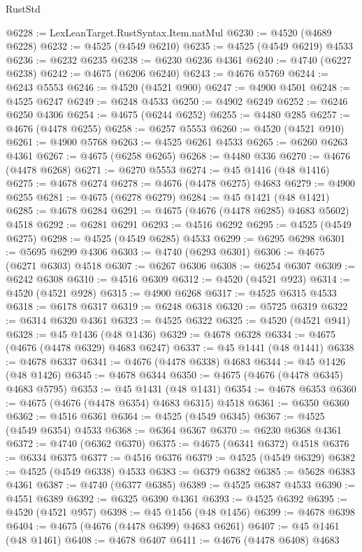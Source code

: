\begin{lexlean}{RustStd}
\begin{coremodule}
@6228 := LexLeanTarget.RustSyntax.Item.natMul
@6230 := @4520 (@4689 @6228)
@6232 := @4525 (@4549 @6210)
@6235 := @4525 (@4549 @6219) @4533
@6236 := @6232 @6235
@6238 := @6230 @6236 @4361
@6240 := @4740 (@6227 @6238)
@6242 := @4675 (@6206 @6240)
@6243 := @4676 @5769
@6244 := @6243 @5553
@6246 := @4520 (@4521 @900)
@6247 := @4900 @4501
@6248 := @4525 @6247
@6249 := @6248 @4533
@6250 := @4902 @6249
@6252 := @6246 @6250 @4306
@6254 := @4675 (@6244 @6252)
@6255 := @4480 @285
@6257 := @4676 (@4478 @6255)
@6258 := @6257 @5553
@6260 := @4520 (@4521 @910)
@6261 := @4900 @5768
@6263 := @4525 @6261 @4533
@6265 := @6260 @6263 @4361
@6267 := @4675 (@6258 @6265)
@6268 := @4480 @336
@6270 := @4676 (@4478 @6268)
@6271 := @6270 @5553
@6274 := @45 @1416 (@48 @1416)
@6275 := @4678 @6274
@6278 := @4676 (@4478 @6275) @4683
@6279 := @4900 @6255
@6281 := @4675 (@6278 @6279)
@6284 := @45 @1421 (@48 @1421)
@6285 := @4678 @6284
@6291 := @4675 (@4676 (@4478 @6285) @4683 @5602) @4518
@6292 := @6281 @6291
@6293 := @4516 @6292
@6295 := @4525 (@4549 @6275)
@6298 := @4525 (@4549 @6285) @4533
@6299 := @6295 @6298
@6301 := @5695 @6299 @4306
@6303 := @4740 (@6293 @6301)
@6306 := @4675 (@6271 @6303) @4518
@6307 := @6267 @6306
@6308 := @6254 @6307
@6309 := @6242 @6308
@6310 := @4516 @6309
@6312 := @4520 (@4521 @923)
@6314 := @4520 (@4521 @928)
@6315 := @4900 @6268
@6317 := @4525 @6315 @4533
@6318 := @6178 @6317
@6319 := @6248 @6318
@6320 := @5725 @6319
@6322 := @6314 @6320 @4361
@6323 := @4525 @6322
@6325 := @4520 (@4521 @941)
@6328 := @45 @1436 (@48 @1436)
@6329 := @4678 @6328
@6334 := @4675 (@4676 (@4478 @6329) @4683 @6247)
@6337 := @45 @1441 (@48 @1441)
@6338 := @4678 @6337
@6341 := @4676 (@4478 @6338) @4683
@6344 := @45 @1426 (@48 @1426)
@6345 := @4678 @6344
@6350 := @4675 (@4676 (@4478 @6345) @4683 @5795)
@6353 := @45 @1431 (@48 @1431)
@6354 := @4678 @6353
@6360 := @4675 (@4676 (@4478 @6354) @4683 @6315) @4518
@6361 := @6350 @6360
@6362 := @4516 @6361
@6364 := @4525 (@4549 @6345)
@6367 := @4525 (@4549 @6354) @4533
@6368 := @6364 @6367
@6370 := @6230 @6368 @4361
@6372 := @4740 (@6362 @6370)
@6375 := @4675 (@6341 @6372) @4518
@6376 := @6334 @6375
@6377 := @4516 @6376
@6379 := @4525 (@4549 @6329)
@6382 := @4525 (@4549 @6338) @4533
@6383 := @6379 @6382
@6385 := @5628 @6383 @4361
@6387 := @4740 (@6377 @6385)
@6389 := @4525 @6387 @4533
@6390 := @4551 @6389
@6392 := @6325 @6390 @4361
@6393 := @4525 @6392
@6395 := @4520 (@4521 @957)
@6398 := @45 @1456 (@48 @1456)
@6399 := @4678 @6398
@6404 := @4675 (@4676 (@4478 @6399) @4683 @6261)
@6407 := @45 @1461 (@48 @1461)
@6408 := @4678 @6407
@6411 := @4676 (@4478 @6408) @4683

\end{coremodule}
\end{lexlean}
